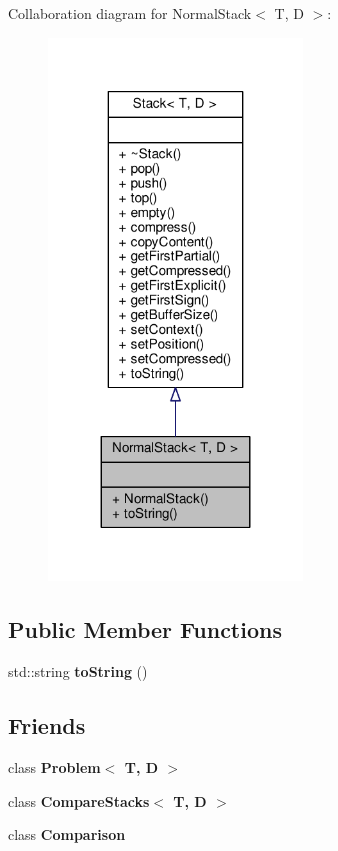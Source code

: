 Collaboration diagram for Normal\+Stack$<$ T, D $>$\+:
\nopagebreak
\begin{figure}[H]
\begin{center}
\leavevmode
\includegraphics[width=191pt]{class_normal_stack__coll__graph}
\end{center}
\end{figure}
\subsection*{Public Member Functions}
\begin{DoxyCompactItemize}
\item 
std\+::string {\bfseries to\+String} ()\hypertarget{class_normal_stack_afdfa737b000d756b1edc7bb077d79137}{}\label{class_normal_stack_afdfa737b000d756b1edc7bb077d79137}

\end{DoxyCompactItemize}
\subsection*{Friends}
\begin{DoxyCompactItemize}
\item 
class {\bfseries Problem$<$ T, D $>$}\hypertarget{class_normal_stack_a49d2c5c1103bce3a8ba02241be7f15c0}{}\label{class_normal_stack_a49d2c5c1103bce3a8ba02241be7f15c0}

\item 
class {\bfseries Compare\+Stacks$<$ T, D $>$}\hypertarget{class_normal_stack_aad0b6ceccdc6599793a7e2e5798b59ad}{}\label{class_normal_stack_aad0b6ceccdc6599793a7e2e5798b59ad}

\item 
class {\bfseries Comparison}\hypertarget{class_normal_stack_aef3aa9a02bb7e4bcae2ebd8975a9206d}{}\label{class_normal_stack_aef3aa9a02bb7e4bcae2ebd8975a9206d}

\end{DoxyCompactItemize}


